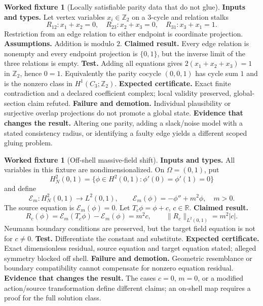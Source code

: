 \documentclass[11pt,a4paper]{article}
\theoremstyle{definition}
\newtheorem{fixture}[definition]{Worked fixture}
\theoremstyle{plain}
\theoremstyle{remark}
\begin{document}
\begin{fixture}[Locally satisfiable parity data that do not glue]
\label{fix:sheaf}
\textbf{Inputs and types.}
Let vertex variables \(x_i\in\mathbb Z_2\) on a 3-cycle and relation stalks
\[
R_{12}:x_1+x_2=0,\quad
R_{23}:x_2+x_3=0,\quad
R_{31}:x_3+x_1=1.
\]
Restriction from an edge relation to either endpoint is coordinate projection.
\textbf{Assumptions.}  Addition is modulo \(2\).
\textbf{Claimed result.}  Every edge relation is nonempty and every endpoint
projection is \(\{0,1\}\), but the inverse limit of the three relations is
empty.
\textbf{Test.}  Adding all equations gives
\(2(x_1+x_2+x_3)=1\) in \(\mathbb Z_2\), hence \(0=1\).  Equivalently the
parity cocycle \((0,0,1)\) has cycle sum \(1\) and is the nonzero class in
\(H^1(C_3;\mathbb Z_2)\).
\textbf{Expected certificate.}  Exact finite contradiction and a declared
coefficient complex; local validity preserved, global-section claim refuted.
\textbf{Failure and demotion.}  Individual plausibility or surjective overlap
projections do not promote a global state.
\textbf{Evidence that changes the result.}  Altering one parity, adding a
slack/noise model with a stated consistency radius, or identifying a faulty
edge yields a different scoped gluing problem.
\end{fixture}

\begin{fixture}[Off-shell massive-field shift]\label{fix:offshell}
\textbf{Inputs and types.}
All variables in this fixture are nondimensionalized.  On \(\Omega=(0,1)\),
put
\[
H_N^2(0,1)=\{\phi\in H^2(0,1):\phi'(0)=\phi'(1)=0\}
\]
and define
\[
\mathcal E_m:H_N^2(0,1)\to L^2(0,1),\qquad
\mathcal E_m(\phi)=-\phi''+m^2\phi,\quad m>0.
\]
The source equation is \(\mathcal E_m(\phi)=0\).  Let
\(T_c\phi=\phi+c\), \(c\in\mathbb R\).
\textbf{Claimed result.}
\[
R_c(\phi)=\mathcal E_m(T_c\phi)-\mathcal E_m(\phi)=m^2c,
\qquad
\|R_c\|_{L^2(0,1)}=m^2|c|.
\]
Neumann boundary conditions are preserved, but the target field equation is
not for \(c\ne0\).
\textbf{Test.}  Differentiate the constant and substitute.
\textbf{Expected certificate.}  Exact dimensionless residual, source equation
and target equation stated; alleged symmetry blocked off shell.
\textbf{Failure and demotion.}  Geometric resemblance or boundary
compatibility cannot compensate for nonzero equation residual.
\textbf{Evidence that changes the result.}  The cases \(c=0\), \(m=0\), or a
modified action/source transformation define different claims; an on-shell
map requires a proof for the full solution class.
\end{fixture}
\end{document}
